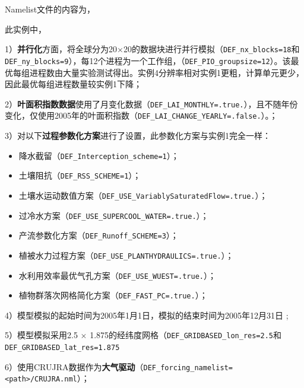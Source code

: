 Namelist文件的内容为，


此实例中，\par
1）\textbf{并行化}方面，将全球分为20\textdegree$\times$20\textdegree 的数据块进行并行模拟（\texttt{DEF\_nx\_blocks=18}和\texttt{DEF\_ny\_blocks=9}），每12个进程为一个工作组，（\texttt{DEF\_PIO\_groupsize=12}）。该最优每组进程数由大量实验测试得出。实例4分辨率相对实例1更粗，计算单元更少，因此最优每组进程数量较实例1下降；\par
2）\textbf{叶面积指数数据}使用了月变化数据（\texttt{DEF\_LAI\_MONTHLY=.true.}），且不随年份变化，仅使用2005年的叶面积指数（\texttt{DEF\_LAI\_CHANGE\_YEARLY=.false.}）。；\par

3）对以下\textbf{过程参数化方案}进行了设置，此参数化方案与实例1完全一样：
\begin{itemize}[nosep,leftmargin=4em]
    \item 降水截留（\texttt{DEF\_Interception\_scheme=1}）；
    \item 土壤阻抗（\texttt{DEF\_RSS\_SCHEME=1}）；
    \item 土壤水运动数值方案（\texttt{DEF\_USE\_VariablySaturatedFlow=.true.}）；
    \item 过冷水方案（\texttt{DEF\_USE\_SUPERCOOL\_WATER=.true.}）；
    \item 产流参数化方案（\texttt{DEF\_Runoff\_SCHEME=3}）；
    \item 植被水力过程方案（\texttt{DEF\_USE\_PLANTHYDRAULICS=.true.}）；
    \item 水利用效率最优气孔方案（\texttt{DEF\_USE\_WUEST=.true.}）；
    \item 植物群落次网格简化方案（\texttt{DEF\_FAST\_PC=.true.}）；

\end{itemize}
\par

4）模型模拟的起始时间为2005年1月1日，模拟的结束时间为2005年12月31日 ;\par

5）模型模拟采用2.5 \textdegree $\times$ 1.875\textdegree 的经纬度网格（\texttt{DEF\_GRIDBASED\_lon\_res=2.5}和\texttt{DEF\_GRIDBASED\_lat\_res=1.875} \par

6）使用CRUJRA数据作为\textbf{大气驱动}（\texttt{DEF\_forcing\_namelist=<path>/CRUJRA.nml}）；\par

